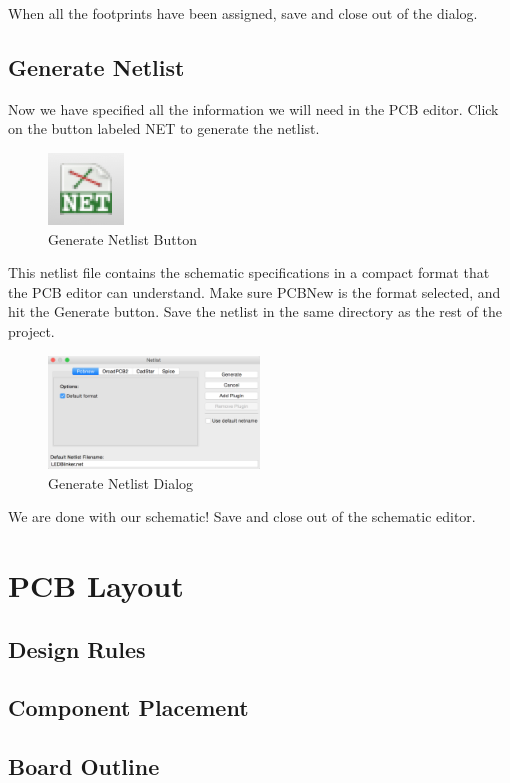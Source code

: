 \documentclass[12pt, oneside]{article}
\begin{document}
When all the footprints have been assigned, save and close out of the dialog.

\subsection{Generate Netlist}
Now we have specified all the information we will need in the PCB editor. Click on the button labeled NET to generate the netlist.

\begin{figure}[H]
\includegraphics{NetlistButton}
\centering
\caption{Generate Netlist Button}
\end{figure}

This netlist file contains the schematic specifications in a compact format that the PCB editor can understand. Make sure PCBNew is the format selected, and hit the Generate button. Save the netlist in the same directory as the rest of the project.

\begin{figure}[H]
\includegraphics[width=0.5\textwidth]{NetlistDialog}
\centering
\caption{Generate Netlist Dialog}
\end{figure}

We are done with our schematic! Save and close out of the schematic editor.

\section{PCB Layout}
\subsection{Design Rules}
\subsection{Component Placement}
\subsection{Board Outline}
\end{document}
